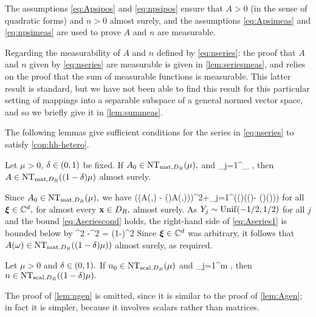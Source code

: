 The assumptions \eqref{eq:Apsipos} and \eqref{eq:npsipos} ensure that $A > 0$ (in the sense of quadratic forms) and $n > 0$  almost surely, and the assumptions \eqref{eq:Apsimeas} and \eqref{eq:npsimeas} are used to prove $A$ and $n$ are measurable.

Regarding the measurability of $A$ and $n$ defined by \eqref{eq:nseries}: the proof that $A$ and $n$ given by \eqref{eq:nseries} are measurable is given in \cref{lem:seriesmeas}, and relies on the proof that the sum of measurable functions
is measurable. This latter result is standard, but we have not been able to find this result for this particular setting of mappings
into a separable subspace of a general normed vector space, and so we briefly give it in \cref{lem:summeas}. 

The following lemmas give sufficient conditions for the series in \eqref{eq:nseries} to satisfy \cref{con:hh-hetero}.

\label{lem:Agen}
Let $\mu > 0$, $\delta \in \mleft(0,1\mright)$ be fixed. If $\Az \in \NTA{\mu},$ and
\beq\label{eq:Aseriescond}
\sum_{j=1}^\infty \esssup_{\bx \in \DR} \NopCCd{\Psij(\bx) - \mleft(\bx\cdot\grad\mright)\Psij(\bx)} \delta\mu,
\eeq
then $A \in \NTA{(1-\delta)\mu}$ almost surely.
\ele

Since $\Az \in \NTA{\mu},$ we have 
\beq\label{eq:Aseries1}
\Big(\mleft(A(\omega,\bx) - \mleft(\bx\cdot\grad\mright)A(\omega,\bx)\mright)\bxi\Big)\cdot\bxib \geq\mu \abs{\bxi}^2+\sum_{j=1}^\infty  \Big(\Yj(\omega)\mleft(\Psij(\bx)- \mleft(\bx\cdot\grad\mright)\Psij(\bx)\mright)\bxi\Big)\cdot\bxib
\eeq
for all $\boldsymbol{\xi} \in \mathbb C^{d},$ for almost every $\mathbf{x} \in D_{R},$ almost surely. As $Y_{j} \sim \mathrm{Unif}(-1/2,1/2)$ for all $j$ and the bound \eqref{eq:Aseriescond} holds, the right-hand side of \eqref{eq:Aseries1} is bounded below by
\beqs
\mu \abs{\bxi}^2 -\delta \mu \abs{\bxi}^2 = (1-\delta)\mu\abs{\bxi}^2
\eeqs
Since $\boldsymbol{\xi} \in \mathbb C^{d}$ was arbitrary, it follows that $A(\omega) \in \NTA{(1-\delta)\mu)}$ almost surely, as required.
\epf

\label{lem:ngen}
Let $\mu > 0$ and $\delta \in \mleft(0,1\mright).$ If $\nz \in \NTn{\mu}$ and
\beq\label{eq:nseriescond}
\sum_{j=1}^m\NLiDRRR{\psij(\bx) + \bx\cdot\grad\psij(\bx)} \delta\mu,
\eeq
then $n \in \NTn{(1-\delta)\mu}.$
\ele

The proof of \cref{lem:ngen} is omitted, since it is similar to the proof of \cref{lem:Agen}; in fact it is simpler, because it involves scalars rather than matrices.
